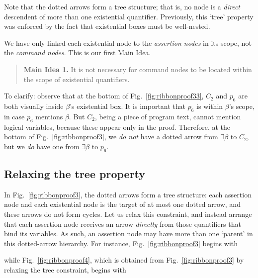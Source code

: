 \documentclass[svgnames]{llncs}
\begin{document}
Note that the dotted arrows form a tree structure; that is, no node is a \emph{direct} descendent of more than one existential quantifier. Previously, this `tree' property was enforced by the fact that existential boxes must be well-nested.

We have only linked each existential node to the \emph{assertion nodes} in its scope, not the \emph{command nodes}. This is our first Main Idea.

\begin{quote}\noindent 
{\bf Main Idea 1.} It is not necessary for command nodes to be located within the scope of existential quantifiers.
\end{quote}

\noindent To clarify: observe that at the bottom of Fig.~\ref{fig:ribbonproof33}, $C_2$ and $p_6$ are both visually inside $β$'s existential box. It is important that $p_6$ is within $β$'s scope, in case $p_6$ mentions $β$. But $C_2$, being a piece of program text, cannot mention logical variables, because these appear only in the proof. Therefore, at the bottom of Fig.~\ref{fig:ribbonproof3}, we \emph{do not} have a dotted arrow from $∃β$ to $C_2$, but we \emph{do} have one from $∃β$ to $p_6$.

\clearpage

\subsection{Relaxing the tree property}

In Fig.~\ref{fig:ribbonproof3}, the dotted arrows form a tree structure: each assertion node and each existential node is the target of at most one dotted arrow, and these arrows do not form cycles. Let us relax this constraint, and instead arrange that each assertion node receives an arrow \emph{directly} from those quantifiers that bind its variables. As such, an assertion node may have more than one `parent' in this dotted-arrow hierarchy. 
For instance, Fig.~\ref{fig:ribbonproof3} begins with
\begin{center}
\end{center}

\noindent while Fig.~\ref{fig:ribbonproof4}, which is obtained from Fig.~\ref{fig:ribbonproof3} by relaxing the tree constraint, begins with
\begin{center}
\end{center}
\end{document}
